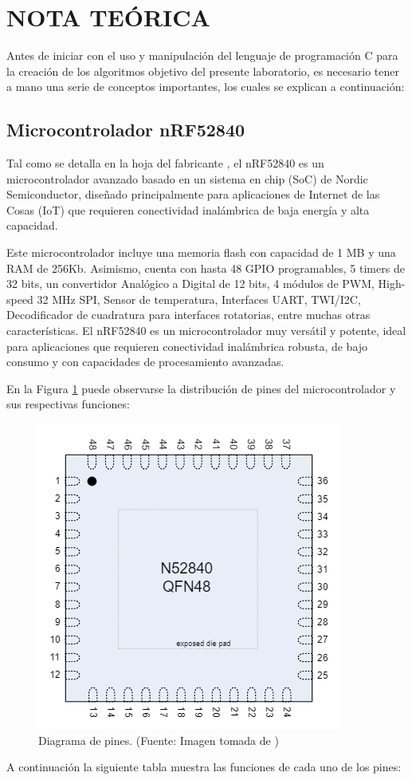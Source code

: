 \newpage
\section{NOTA TEÓRICA}

Antes de iniciar con el uso y manipulación del lenguaje de programación C para la creación de los algoritmos objetivo del presente laboratorio, es necesario tener a mano una serie de conceptos importantes, los cuales se explican a continuación: 

\subsection{Microcontrolador nRF52840}
Tal como se detalla en la hoja del fabricante \cite{ST}, el nRF52840 es un microcontrolador avanzado basado en un sistema en chip (SoC) de Nordic Semiconductor, diseñado principalmente para aplicaciones de Internet de las Cosas (IoT) que requieren conectividad inalámbrica de baja energía y alta capacidad.

Este microcontrolador incluye una memoria flash con capacidad de 1 MB y una RAM de 256Kb. Asimismo, cuenta con hasta 48 GPIO programables, 5 timers de 32 bits, un convertidor Analógico a Digital de 12 bits, 4 módulos de PWM, High-speed 32 MHz SPI, Sensor de temperatura, Interfaces UART, TWI/I2C, Decodificador de cuadratura para interfaces rotatorias, entre muchas otras características. El nRF52840 es un microcontrolador muy versátil y potente, ideal para aplicaciones que requieren conectividad inalámbrica robusta, de bajo consumo y con capacidades de procesamiento avanzadas. 

En la Figura \ref{fig:ST_pins} puede observarse la distribución de pines del microcontrolador y sus respectivas funciones:  

\begin{figure}[H]
\centering
\includegraphics[scale=0.5]{./Figuras/Nota_teorica/Diagrama de pines}
\caption{Diagrama de pines. (Fuente: Imagen tomada de \cite{ST})}
\label{fig:ST_pins}
\end{figure}
A continuación la siguiente tabla muestra las funciones de cada uno de los pines:

